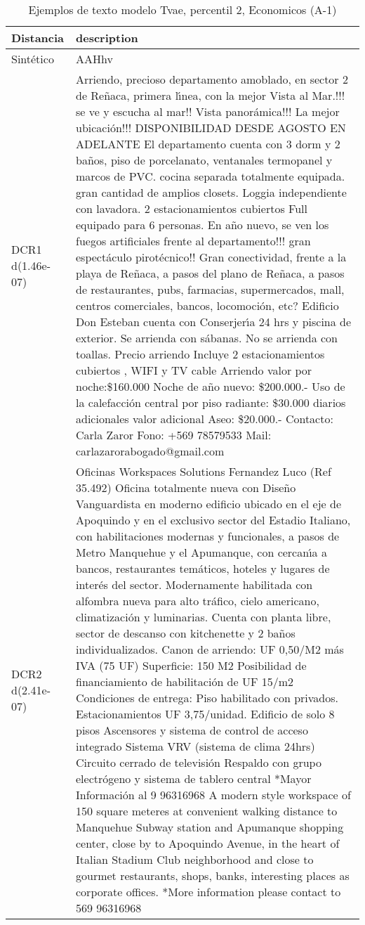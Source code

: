 \begin{table}[H]
\centering
\fontsize{10}{14}\selectfont
\caption{Ejemplos de texto modelo Tvae, percentil 2, Economicos (A-1)}
\label{table-example-economicos-a-1-tvae-2p-text}
\begin{tabular}{|l|m{35em}|}
\hline
\rowcolor[gray]{0.8}
Distancia & description \\
\hline Sintético & AAHhv \\
\hline DCR1 d(1.46e-07) & Arriendo, precioso departamento amoblado, en sector 2 de Re\~naca, primera l{\'\i}nea, con la mejor Vista al Mar.!!! se ve y escucha al mar!! Vista panor\'amica!!! La mejor ubicaci\'on!!! DISPONIBILIDAD DESDE AGOSTO EN ADELANTE El departamento cuenta con 3 dorm y 2 ba\~nos, piso de porcelanato, ventanales termopanel y marcos de PVC. cocina separada totalmente equipada. gran cantidad de amplios closets. Loggia independiente con lavadora. 2 estacionamientos cubiertos Full equipado para 6 personas. En a\~no nuevo, se ven los fuegos artificiales frente al departamento!!! gran espect\'aculo pirot\'ecnico!! Gran conectividad, frente a la playa de Re\~naca, a pasos del plano de Re\~naca, a pasos de restaurantes, pubs, farmacias, supermercados, mall, centros comerciales, bancos, locomoci\'on, etc?  Edificio Don Esteban cuenta con Conserjer{\'\i}a 24 hrs y piscina de exterior.  Se arrienda con s\'abanas.  No se arrienda con toallas.  Precio arriendo Incluye 2 estacionamientos cubiertos , WIFI y TV cable  Arriendo valor por noche:\$160.000  Noche de a\~no nuevo: \$200.000.-  Uso de la calefacci\'on central por piso radiante: \$30.000 diarios adicionales  valor adicional Aseo: \$20.000.-  Contacto: Carla Zaror Fono: +569 78579533 Mail: carlazarorabogado@gmail.com \\
\hline DCR2 d(2.41e-07) & Oficinas Workspaces Solutions Fernandez Luco (Ref 35.492)  Oficina totalmente nueva con Dise\~no Vanguardista en moderno edificio ubicado en el eje de Apoquindo y en el exclusivo sector del Estadio Italiano, con habilitaciones modernas y funcionales, a pasos de Metro Manquehue y el Apumanque, con cercan{\'\i}a a bancos, restaurantes tem\'aticos, hoteles y lugares de inter\'es del sector. Modernamente habilitada con alfombra nueva para alto tr\'afico, cielo americano, climatizaci\'on y luminarias. Cuenta con planta libre, sector de descanso con kitchenette y 2 ba\~nos individualizados.   Canon de arriendo: UF 0,50/M2 m\'as IVA (75 UF)   Superficie: 150 M2   Posibilidad de financiamiento de habilitaci\'on de UF 15/m2   Condiciones de entrega: Piso habilitado con privados.   Estacionamientos UF 3,75/unidad.   Edificio de solo 8 pisos   Ascensores y sistema de control de acceso integrado   Sistema VRV (sistema de clima 24hrs)   Circuito cerrado de televisi\'on   Respaldo con grupo electr\'ogeno y sistema de tablero central *Mayor Informaci\'on al 9 96316968 A modern style workspace of 150 square meteres at convenient walking distance to Manquehue Subway station and Apumanque shopping center, close by to Apoquindo Avenue, in the heart of Italian Stadium Club neighborhood and close to gourmet restaurants, shops, banks, interesting places as corporate offices. *More information please contact to 569 96316968 \\
\hline
\end{tabular}
\end{table}
